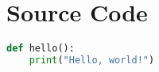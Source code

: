 \chapter*{Source Code}
\begin{lstlisting}[language=Python]
def hello():
    print("Hello, world!")
\end{lstlisting}
